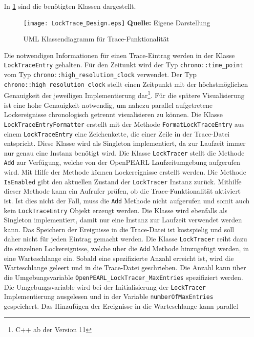 In \cref{fig:LockTrace_Design} sind die benötigten Klassen dargestellt.
\begin{figure}[ht]
  \texttt{[image: LockTrace\_Design.eps]}
  \footnotesize\sffamily\textbf{Quelle:} Eigene Darstellung
  \caption{UML Klassendiagramm für Trace-Funktionalität}
  \label{fig:LockTrace_Design}
\end{figure}
Die notwendigen Informationen für einen Trace-Eintrag werden in der Klasse
\texttt{Lock\-Trace\-Entry} gehalten. Für den Zeitunkt wird der Typ 
\texttt{chrono::\-time\_point} vom Typ \texttt{chrono::\-high\_resolution\_clock}
verwendet. Der Typ \texttt{chrono::\-high\_resolution\_clock} stellt einen
Zeitpunkt mit der höchstmöglichen Genauigkeit der jeweiligen Implementierung
dar\footnote{C++ ab der Version 11}. Für die spätere Visualisierung ist eine
hohe Genauigkeit notwendig, um nahezu parallel aufgetretene Lockereignisse
chronologisch getrennt visualisieren zu können. Die Klasse
\texttt{Lock\-Trace\-Entry\-Formatter} erstellt mit der Methode
\texttt{Format\-Lock\-Trace\-Entry} aus einem \texttt{Lock\-Trace\-Entry} eine
Zeichenkette, die einer Zeile in der Trace-Datei entspricht. Diese Klasse wird
als Singleton implementiert, da zur Laufzeit immer nur genau eine Instanz
benötigt wird. Die Klasse \texttt{Lock\-Tracer} stellt die Methode \texttt{Add}
zur Verfügung, welche von der OpenPEARL Laufzeitumgebung aufgerufen wird. Mit
Hilfe der Methode können Lockereignisse erstellt werden. Die Methode
\texttt{IsEnabled} gibt den aktuellen Zustand der \texttt{Lock\-Tracer} Instanz
zurück. Mithilfe dieser Methode kann ein Aufrufer prüfen, ob die
Trace-Funktionalität aktiviert ist. Ist dies nicht der Fall, muss die
\texttt{Add} Methode nicht aufgerufen und somit auch kein
\texttt{Lock\-Trace\-Entry} Objekt erzeugt werden. Die Klasse wird ebenfalls als
Singleton implementiert, damit nur eine Instanz zur Laufzeit verwendet werden
kann. Das Speichern der Ereignisse in die Trace-Datei ist kostspielig und soll
daher nicht für jeden Eintrag gemacht werden. Die Klasse \texttt{Lock\-Tracer}
reiht dazu die einzelnen Lockereignisse, welche über die \texttt{Add} Methode
hinzugefügt werden, in eine Warteschlange ein. Sobald eine spezifizierte Anzahl
erreicht ist, wird die Warteschlange geleert und in die Trace-Datei geschrieben.
Die Anzahl kann über die Umgebungsvariable
\texttt{OpenPEARL\_LockTracer\_MaxEntries} spezifiziert werden. Die
Umgebungsvariable wird bei der Initialisierung der \texttt{Lock\-Tracer}
Implementierung ausgelesen und in der Variable \texttt{number\-Of\-Max\-Entries}
gespeichert. Das Hinzufügen der Ereignisse in die Warteschlange kann parallel
